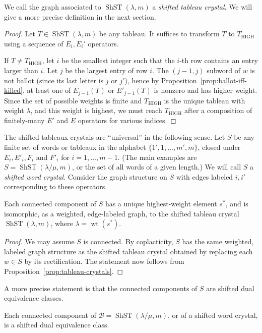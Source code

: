 \documentclass[ALCO,ThmDefs,Unicode,epreuves]{cedram}
\DeclareMathOperator{\ShST}{ShST}
\DeclareMathOperator{\wt}{wt}
\DeclareMathOperator{\HIGH}{HIGH}
\newcommand{\B}{\mathcal{B}}
\begin{document}
We call the graph associated to $\ShST(\lambda,m)$ a \emph{shifted tableau crystal}. We will give a more precise definition in the next section.

\begin{proof}
Let $T \in \ShST(\lambda,m)$ be any tableau. It suffices to transform $T$ to $T_{\HIGH }$ using a sequence of $E_i,E_i'$ operators.

If $T \ne T_{\HIGH }$, let $i$ be the smallest integer such that the $i$-th row contains an entry larger than $i$. Let $j$ be the largest entry of row $i$. The $(j-1,j)$ subword of $w$ is not ballot (since its last letter is $j$ or $j'$), hence by Proposition~\ref{prop:ballot-iff-killed}, at least one of $E_{j-1}(T)$ or $E'_{j-1}(T)$ is nonzero and has higher weight. Since the set of possible weights is finite and $T_{\HIGH }$ is the unique tableau with weight $\lambda$, and this weight is highest, we must reach $T_{\HIGH }$ after a composition of finitely-many $E'$ and $E$ operators for various indices.
\end{proof}

The shifted tableaux crystals are ``universal'' in the following sense. Let $S$ be any finite set of words or tableaux in the alphabet $\{1',1, \ldots, m', m\}$, closed under $E_i, E'_i, F_i$ and $F'_i$ for $i = 1, \ldots, m-1$. (The main examples are $S = \ShST(\lambda/\mu,m)$, or the set of all words of a given length.) We will call $S$ a \emph{shifted word crystal}. Consider the graph structure on $S$ with edges labeled $i,i'$ corresponding to these operators.

\begin{coro} \label{cor:unique-highest-weight}
Each connected component of $S$ has a unique highest-weight element $s^*$, and is isomorphic, as a weighted, edge-labeled graph, to the shifted tableau crystal $\ShST(\lambda,m)$, where $\lambda = \wt (s^*)$.
\end{coro}
\begin{proof}
We may assume $S$ is connected. By coplacticity, $S$ has the same weighted, labeled graph structure as the shifted tableau crystal obtained by replacing each $w \in S$ by its rectification. The statement now follows from Proposition~\ref{prop:tableau-crystals}.
\end{proof}

A more precise statement is that the connected components of $S$ are shifted dual equivalence classes.

\begin{coro}
Each connected component of $\B=\ShST(\lambda/\mu,m)$, or of a shifted word crystal, is a shifted dual equivalence class. 
\end{coro}
\end{document}
